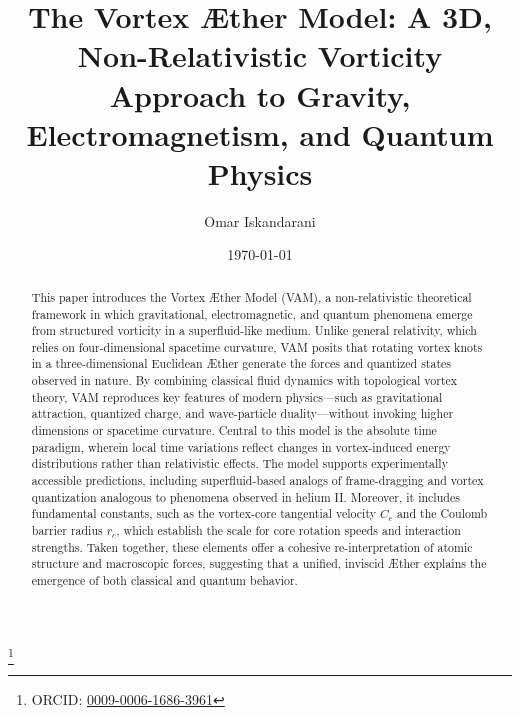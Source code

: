 \documentclass[aps,preprint,superscriptaddress]{revtex4-2}
\begin{document}
    \author{Omar Iskandarani}
    \title{The Vortex Æther Model: A 3D, Non-Relativistic Vorticity Approach to Gravity, Electromagnetism, and Quantum Physics}
    \date{\today}
    \thanks{ORCID: \href{https://orcid.org/0009-0006-1686-3961}{0009-0006-1686-3961}}

    \begin{abstract}
        This paper introduces the Vortex Æther Model (VAM), a non-relativistic theoretical framework in which gravitational, electromagnetic, and quantum phenomena emerge from structured vorticity in a superfluid-like medium. Unlike general relativity, which relies on four-dimensional spacetime curvature, VAM posits that rotating vortex knots in a three-dimensional Euclidean Æther generate the forces and quantized states observed in nature. By combining classical fluid dynamics with topological vortex theory, VAM reproduces key features of modern physics—such as gravitational attraction, quantized charge, and wave-particle duality—without invoking higher dimensions or spacetime curvature. Central to this model is the absolute time paradigm, wherein local time variations reflect changes in vortex-induced energy distributions rather than relativistic effects. The model supports experimentally accessible predictions, including superfluid-based analogs of frame-dragging and vortex quantization analogous to phenomena observed in helium II. Moreover, it includes fundamental constants, such as the vortex-core tangential velocity $C_e$ and the Coulomb barrier radius $r_c$, which establish the scale for core rotation speeds and interaction strengths. Taken together, these elements offer a cohesive re-interpretation of atomic structure and macroscopic forces, suggesting that a unified, inviscid Æther explains the emergence of both classical and quantum behavior.
    \end{abstract}

    \maketitle

\end{document}
